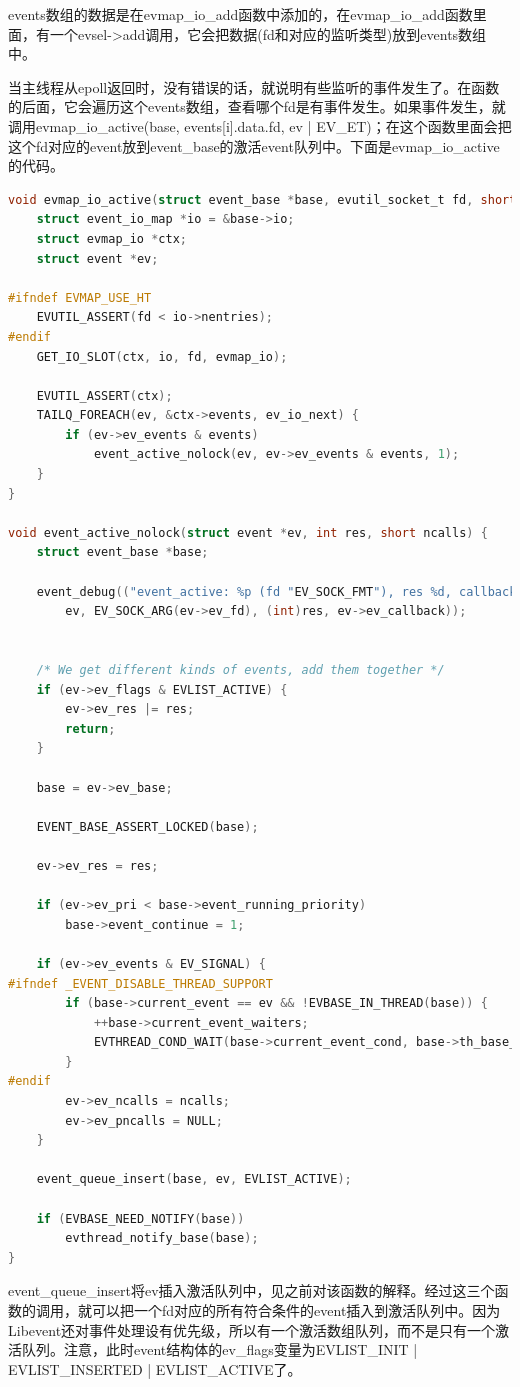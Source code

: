 \documentclass[11pt,a4paper]{article}
\begin{document}
events数组的数据是在evmap\_io\_add函数中添加的，在evmap\_io\_add函数里面，有一个evsel->add调用，它会把数据(fd和对应的监听类型)放到events数组中。
 
当主线程从epoll返回时，没有错误的话，就说明有些监听的事件发生了。在函数的后面，它会遍历这个events数组，查看哪个fd是有事件发生。如果事件发生，就调用evmap\_io\_active(base, events[i].data.fd, ev | EV\_ET)；在这个函数里面会把这个fd对应的event放到event\_base的激活event队列中。下面是evmap\_io\_active的代码。

\begin{lstlisting}[language=C]
void evmap_io_active(struct event_base *base, evutil_socket_t fd, short events) {
	struct event_io_map *io = &base->io;
	struct evmap_io *ctx;
	struct event *ev;

#ifndef EVMAP_USE_HT
	EVUTIL_ASSERT(fd < io->nentries);
#endif
	GET_IO_SLOT(ctx, io, fd, evmap_io);

	EVUTIL_ASSERT(ctx);
	TAILQ_FOREACH(ev, &ctx->events, ev_io_next) {
		if (ev->ev_events & events)
			event_active_nolock(ev, ev->ev_events & events, 1);
	}
}

void event_active_nolock(struct event *ev, int res, short ncalls) {
	struct event_base *base;

	event_debug(("event_active: %p (fd "EV_SOCK_FMT"), res %d, callback %p",
		ev, EV_SOCK_ARG(ev->ev_fd), (int)res, ev->ev_callback));


	/* We get different kinds of events, add them together */
	if (ev->ev_flags & EVLIST_ACTIVE) {
		ev->ev_res |= res;
		return;
	}

	base = ev->ev_base;

	EVENT_BASE_ASSERT_LOCKED(base);

	ev->ev_res = res;

	if (ev->ev_pri < base->event_running_priority)
		base->event_continue = 1;

	if (ev->ev_events & EV_SIGNAL) {
#ifndef _EVENT_DISABLE_THREAD_SUPPORT
		if (base->current_event == ev && !EVBASE_IN_THREAD(base)) {
			++base->current_event_waiters;
			EVTHREAD_COND_WAIT(base->current_event_cond, base->th_base_lock);
		}
#endif
		ev->ev_ncalls = ncalls;
		ev->ev_pncalls = NULL;
	}

	event_queue_insert(base, ev, EVLIST_ACTIVE);

	if (EVBASE_NEED_NOTIFY(base))
		evthread_notify_base(base);
}
\end{lstlisting}
event\_queue\_insert将ev插入激活队列中，见之前对该函数的解释。经过这三个函数的调用，就可以把一个fd对应的所有符合条件的event插入到激活队列中。因为Libevent还对事件处理设有优先级，所以有一个激活数组队列，而不是只有一个激活队列。注意，此时event结构体的ev\_flags变量为EVLIST\_INIT | EVLIST\_INSERTED | EVLIST\_ACTIVE了。
\end{document}
